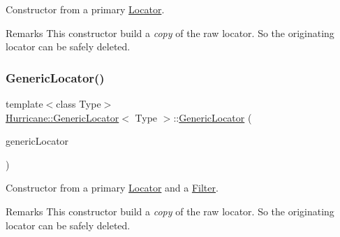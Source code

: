 Constructor from a primary \mbox{\hyperlink{classHurricane_1_1Locator}{Locator}}.

\begin{DoxyRemark}{Remarks}
This constructor build a {\itshape copy} of the raw locator. So the originating locator can be safely deleted. 
\end{DoxyRemark}
\mbox{\label{classHurricane_1_1GenericLocator_aa314dea86573d1cee1d1eea8ac2ab49e}} 
\subsubsection{\texorpdfstring{Generic\+Locator()}{GenericLocator()}\hspace{0.1cm}{\footnotesize\ttfamily [2/3]}}
{\footnotesize\ttfamily template$<$class Type$>$ \\
\mbox{\hyperlink{classHurricane_1_1GenericLocator}{Hurricane\+::\+Generic\+Locator}}$<$ Type $>$\+::\mbox{\hyperlink{classHurricane_1_1GenericLocator}{Generic\+Locator}} (\begin{DoxyParamCaption}\item[{const \mbox{\hyperlink{classHurricane_1_1GenericLocator}{Generic\+Locator}}$<$ Type $>$ \&}]{generic\+Locator }\end{DoxyParamCaption})\hspace{0.3cm}{\ttfamily [inline]}}

Constructor from a primary \mbox{\hyperlink{classHurricane_1_1Locator}{Locator}} and a \mbox{\hyperlink{classHurricane_1_1Filter}{Filter}}.

\begin{DoxyRemark}{Remarks}
This constructor build a {\itshape copy} of the raw locator. So the originating locator can be safely deleted. 
\end{DoxyRemark}
\mbox{\label{classHurricane_1_1GenericLocator_a4706b6502b806f90f2374df76791a729}} 
